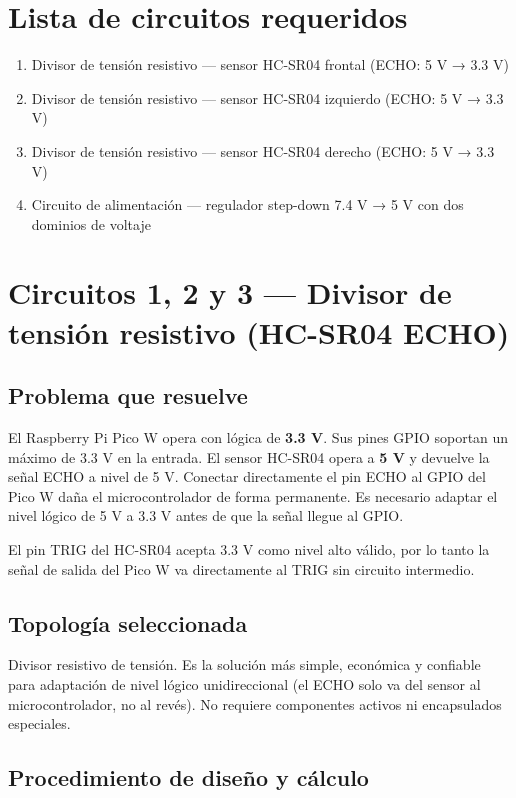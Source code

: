 \documentclass[12pt]{report}
\begin{document}
\section{Lista de circuitos requeridos}

\begin{enumerate}
    \item Divisor de tensión resistivo — sensor HC-SR04 frontal (ECHO: 5 V → 3.3 V)
    \item Divisor de tensión resistivo — sensor HC-SR04 izquierdo (ECHO: 5 V → 3.3 V)
    \item Divisor de tensión resistivo — sensor HC-SR04 derecho (ECHO: 5 V → 3.3 V)
    \item Circuito de alimentación — regulador step-down 7.4 V → 5 V con dos dominios de voltaje
\end{enumerate}

\section{Circuitos 1, 2 y 3 — Divisor de tensión resistivo (HC-SR04 ECHO)}

\subsection{Problema que resuelve}

El Raspberry Pi Pico W opera con lógica de \textbf{3.3 V}. Sus pines GPIO soportan un máximo de 3.3 V en la entrada. El sensor HC-SR04 opera a \textbf{5 V} y devuelve la señal ECHO a nivel de 5 V. Conectar directamente el pin ECHO al GPIO del Pico W daña el microcontrolador de forma permanente. Es necesario adaptar el nivel lógico de 5 V a 3.3 V antes de que la señal llegue al GPIO.

El pin TRIG del HC-SR04 acepta 3.3 V como nivel alto válido, por lo tanto la señal de salida del Pico W va directamente al TRIG sin circuito intermedio.

\subsection{Topología seleccionada}

Divisor resistivo de tensión. Es la solución más simple, económica y confiable para adaptación de nivel lógico unidireccional (el ECHO solo va del sensor al microcontrolador, no al revés). No requiere componentes activos ni encapsulados especiales.

\subsection{Procedimiento de diseño y cálculo}
\end{document}
